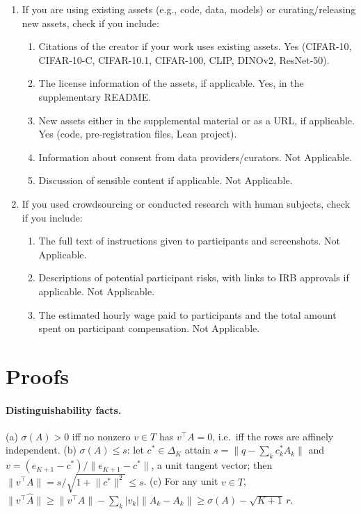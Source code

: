 \documentclass[twoside]{article}
\begin{document}
\begin{enumerate}
\begin{enumerate}
    \item A description of the computing infrastructure used. Yes (\cref{app:details}).
  \end{enumerate}
  \item If you are using existing assets (e.g., code, data, models) or curating/releasing new assets,
  check if you include:
  \begin{enumerate}
    \item Citations of the creator if your work uses existing assets. Yes (CIFAR-10, CIFAR-10-C, CIFAR-10.1,
    CIFAR-100, CLIP, DINOv2, ResNet-50).
    \item The license information of the assets, if applicable. Yes, in the supplementary README.
    \item New assets either in the supplemental material or as a URL, if applicable. Yes (code,
    pre-registration files, Lean project).
    \item Information about consent from data providers/curators. Not Applicable.
    \item Discussion of sensible content if applicable. Not Applicable.
  \end{enumerate}
  \item If you used crowdsourcing or conducted research with human subjects, check if you include:
  \begin{enumerate}
    \item The full text of instructions given to participants and screenshots. Not Applicable.
    \item Descriptions of potential participant risks, with links to IRB approvals if applicable. Not
    Applicable.
    \item The estimated hourly wage paid to participants and the total amount spent on participant
    compensation. Not Applicable.
  \end{enumerate}
\end{enumerate}

\clearpage
\appendix
\onecolumn

\section{Proofs}
\label{app:proofs}

\paragraph{Distinguishability facts.} (a) $\sigma(A)>0$ iff no nonzero $v\in T$ has $v^{\top}A=0$, i.e.\
iff the rows are affinely independent. (b) $\sigma(A)\le s$: let $c^{*}\in\Delta_K$ attain
$s=\lVert q-\sum_kc^{*}_kA_k\rVert$ and $v=(e_{K+1}-c^{*})/\lVert e_{K+1}-c^{*}\rVert$, a unit tangent
vector; then $\lVert v^{\top}A\rVert=s/\sqrt{1+\lVert c^{*}\rVert^2}\le s$. (c) For any unit $v\in T$,
$\lVert v^{\top}\hat A\rVert\ge\lVert v^{\top}A\rVert-\sum_k|v_k|\lVert\hat A_k-A_k\rVert\ge\sigma(A)-\sqrt{K+1}\,r$.
\end{document}
